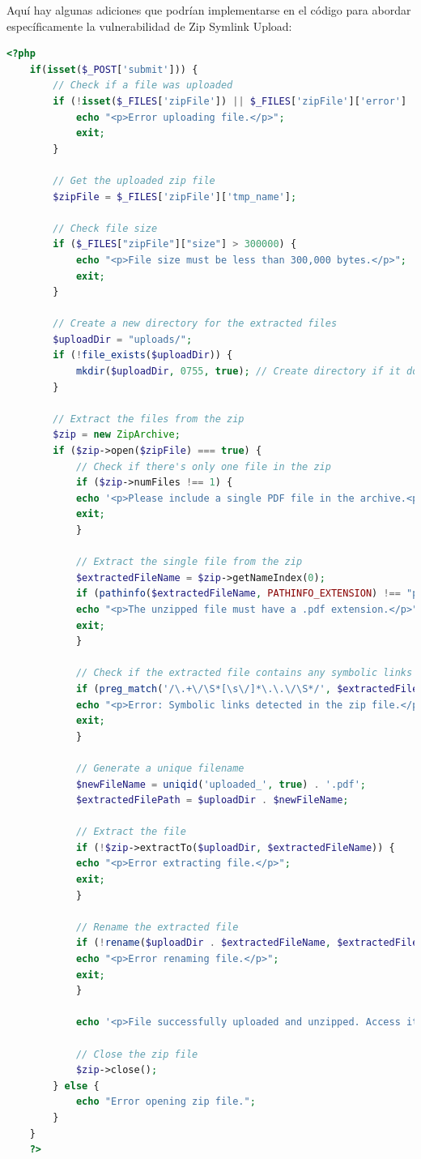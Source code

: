 \documentclass[a4paper]{article} %
\begin{document}
    Aquí hay algunas adiciones que podrían implementarse en el código para abordar específicamente la vulnerabilidad de Zip Symlink Upload:

    \begin{lstlisting}[language=php, caption=Archivo upload.php]
    <?php
    if(isset($_POST['submit'])) {
        // Check if a file was uploaded
        if (!isset($_FILES['zipFile']) || $_FILES['zipFile']['error'] !== UPLOAD_ERR_OK) {
            echo "<p>Error uploading file.</p>";
            exit;
        }

        // Get the uploaded zip file
        $zipFile = $_FILES['zipFile']['tmp_name'];

        // Check file size
        if ($_FILES["zipFile"]["size"] > 300000) {
            echo "<p>File size must be less than 300,000 bytes.</p>";
            exit;
        }

        // Create a new directory for the extracted files
        $uploadDir = "uploads/";
        if (!file_exists($uploadDir)) {
            mkdir($uploadDir, 0755, true); // Create directory if it doesn't exist
        }

        // Extract the files from the zip
        $zip = new ZipArchive;
        if ($zip->open($zipFile) === true) {
            // Check if there's only one file in the zip
            if ($zip->numFiles !== 1) {
            echo '<p>Please include a single PDF file in the archive.<p>';
            exit;
            }

            // Extract the single file from the zip
            $extractedFileName = $zip->getNameIndex(0);
            if (pathinfo($extractedFileName, PATHINFO_EXTENSION) !== "pdf") {
            echo "<p>The unzipped file must have a .pdf extension.</p>";
            exit;
            }

            // Check if the extracted file contains any symbolic links
            if (preg_match('/\.+\/\S*[\s\/]*\.\.\/\S*/', $extractedFileName) === 1) {
            echo "<p>Error: Symbolic links detected in the zip file.</p>";
            exit;
            }

            // Generate a unique filename
            $newFileName = uniqid('uploaded_', true) . '.pdf';
            $extractedFilePath = $uploadDir . $newFileName;

            // Extract the file
            if (!$zip->extractTo($uploadDir, $extractedFileName)) {
            echo "<p>Error extracting file.</p>";
            exit;
            }

            // Rename the extracted file
            if (!rename($uploadDir . $extractedFileName, $extractedFilePath)) {
            echo "<p>Error renaming file.</p>";
            exit;
            }

            echo '<p>File successfully uploaded and unzipped. Access it <a href="' . $extractedFilePath . '">here</a>.</p>';

            // Close the zip file
            $zip->close();
        } else {
            echo "Error opening zip file.";
        }
    }
    ?>
    \end{lstlisting}
\end{document}

